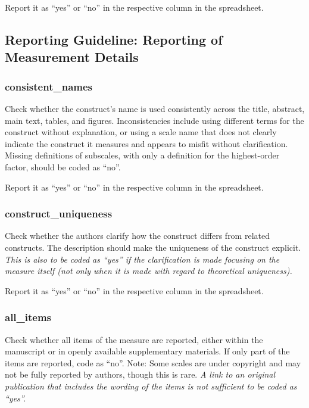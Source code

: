 {Report it as ``yes'' or ``no'' in the respective column in the spreadsheet.


\subsection*{Reporting Guideline: Reporting of Measurement Details}

\subsubsection*{consistent\_names}
\label{names}
Check whether the construct's name is used consistently across the title, abstract, main text, tables, and figures. Inconsistencies include using different terms for the construct without explanation, or using a scale name that does not clearly indicate the construct it measures and appears to misfit without clarification. Missing definitions of subscales, with only a definition for the highest-order factor, should be coded as ``no''.

Report it as ``yes'' or ``no'' in the respective column in the spreadsheet.

\subsubsection*{construct\_uniqueness}
\label{unique}
Check whether the authors clarify how the construct differs from related constructs. The description should make the uniqueness of the construct explicit. \textit{This is also to be coded as ``yes'' if the clarification is made focusing on the measure itself (not only when it is made with regard to theoretical uniqueness).}

Report it as ``yes'' or ``no'' in the respective column in the spreadsheet.

\subsubsection*{all\_items}
\label{items}
Check whether all items of the measure are reported, either within the manuscript or in openly available supplementary materials. If only part of the items are reported, code as ``no''. Note: Some scales are under copyright and may not be fully reported by authors, though this is rare. \textit{A link to an original publication that includes the wording of the items is not sufficient to be coded as ``yes''.}

}
